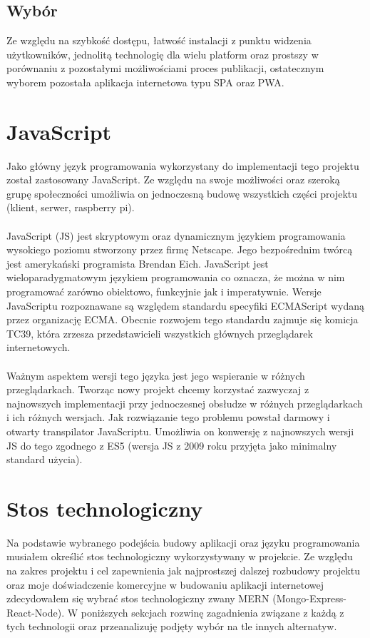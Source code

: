 \subsection{Wybór}
Ze względu na szybkość dostępu, łatwość instalacji z punktu widzenia użytkowników, jednolitą technologię dla wielu platform oraz prostszy w porównaniu z pozostałymi możliwościami proces publikacji, ostatecznym wyborem pozostała aplikacja internetowa typu SPA oraz PWA.

\section{JavaScript}

Jako główny język programowania wykorzystany do implementacji tego projektu został zastosowany JavaScript. Ze względu na swoje możliwości oraz szeroką grupę społeczności umożliwia on jednoczesną budowę wszystkich części projektu (klient, serwer, raspberry pi).
\\\\
JavaScript (JS) jest skryptowym oraz dynamicznym językiem programowania wysokiego poziomu stworzony przez firmę Netscape. Jego bezpośrednim twórcą jest amerykański programista Brendan Eich. JavaScript jest wieloparadygmatowym językiem programowania co oznacza, że można w nim programować zarówno obiektowo, funkcyjnie jak i imperatywnie. Wersje JavaScriptu rozpoznawane są względem standardu specyfiki ECMAScript wydaną przez organizację ECMA. Obecnie rozwojem tego standardu zajmuje się komicja TC39, która zrzesza przedstawicieli wszystkich głównych przeglądarek internetowych.
\\\\
Ważnym aspektem wersji tego języka jest jego wspieranie w różnych przeglądarkach. Tworząc nowy projekt chcemy korzystać zazwyczaj z najnowszych implementacji przy jednoczesnej obsłudze w różnych przeglądarkach i ich różnych wersjach. Jak rozwiązanie tego problemu powstał darmowy i otwarty transpilator JavaScriptu. Umożliwia on konwersję z najnowszych wersji JS do tego zgodnego z ES5 (wersja JS z 2009 roku przyjęta jako minimalny standard użycia).

\section{Stos technologiczny}
Na podstawie wybranego podejścia budowy aplikacji oraz języku programowania musiałem określić stos technologiczny wykorzystywany w projekcie.
Ze względu na zakres projektu i cel zapewnienia jak najprostszej dalszej rozbudowy projektu oraz moje doświadczenie komercyjne w budowaniu aplikacji internetowej zdecydowałem się wybrać stos technologiczny zwany MERN (Mongo-Express-React-Node). W poniższych sekcjach rozwinę zagadnienia związane z każdą z tych technologii oraz przeanalizuję podjęty wybór na tle innych alternatyw.

